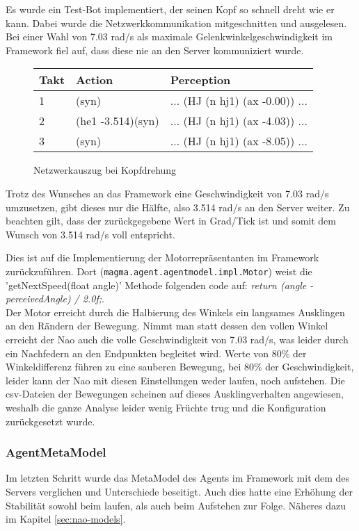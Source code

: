 Es wurde ein Test-Bot implementiert, der seinen Kopf so schnell dreht wie er kann. Dabei wurde die Netzwerkkommunikation mitgeschnitten und ausgelesen.
Bei einer Wahl von 7.03 rad/s als maximale Gelenkwinkelgeschwindigkeit im Framework fiel auf, dass diese nie an den Server kommuniziert wurde.

\begin{figure}[H]
	\centering
	\begin{tabularx}{\textwidth}{|X|X|X|}
		\hline
		Takt & Action & Perception\\
		\hline
		1 & (syn) & ... (HJ (n hj1) (ax -0.00)) ...\\
		\hline
        2 & (he1 -3.514)(syn) & ... (HJ (n hj1) (ax -4.03)) ...\\
        \hline
        3 & (syn) & ... (HJ (n hj1) (ax -8.05)) ...\\
		\hline
	\end{tabularx}
	\caption{Netzwerkauszug bei Kopfdrehung}
	\label{fig:networkjointanalysis}
\end{figure}

Trotz des Wunsches an das Framework eine Geschwindigkeit von 7.03 rad/s umzusetzen, gibt dieses nur die Hälfte, also 3.514 rad/s an den Server weiter.
Zu beachten gilt, dass der zurückgegebene Wert in Grad/Tick ist und somit dem Wunsch von 3.514 rad/s voll entspricht.

Dies ist auf die Implementierung der Motorrepräsentanten im Framework zurückzuführen.
Dort (\texttt{magma.agent.agentmodel.impl.Motor}) weist die 'getNextSpeed(float angle)' Methode folgenden code auf: \textit{return (angle - perceivedAngle) / 2.0f;}.\\
Der Motor erreicht durch die Halbierung des Winkels ein langsames Ausklingen an den Rändern der Bewegung. Nimmt man statt dessen den vollen Winkel erreicht der Nao auch die volle Geschwindigkeit von 7.03 rad/s, was leider durch ein Nachfedern an den Endpunkten begleitet wird. Werte von 80\% der Winkeldifferenz führen zu eine sauberen Bewegung, bei 80\% der Geschwindigkeit, leider kann der Nao mit diesen Einstellungen weder laufen, noch aufstehen. Die csv-Dateien der Bewegungen scheinen auf dieses Ausklingverhalten angewiesen, weshalb die ganze Analyse leider wenig Früchte trug und die Konfiguration zurückgesetzt wurde.

\subsubsection{AgentMetaModel}
Im letzten Schritt wurde das MetaModel des Agents im Framework mit dem des Servers verglichen und Unterschiede beseitigt. Auch dies hatte eine Erhöhung der Stabilität sowohl beim laufen, als auch beim Aufstehen zur Folge. Näheres dazu im Kapitel \ref{sec:nao-models}.